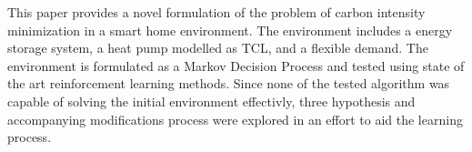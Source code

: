 This paper provides a novel formulation of the problem of carbon intensity minimization in a smart home environment. The environment includes a energy storage system, a heat pump modelled as TCL, and a flexible demand. The environment is formulated as a Markov Decision Process and tested using state of the art reinforcement learning methods. Since none of the tested algorithm was capable of solving the initial environment effectivly, three hypothesis and accompanying modifications process were explored in an effort to aid the learning process.